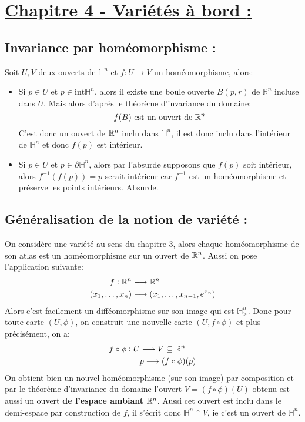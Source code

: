 \section*{\uline{Chapitre 4 - Variétés à bord {:}}}
   \subsection*{Invariance par homéomorphisme {:}}
      Soit \(U, V\) deux ouverts de \( \mathbb{H}^n \) et \(f : U \longrightarrow V\) un homéomorphisme, alors:
      \begin{itemize}
         \item Si \( p \in U \) et \( p \in \text{int}\mathbb{H}^n\), alors il existe une boule ouverte \( B(p, r) \) de \( \mathbb{R}^n \) incluse dans \( U \). Mais alors d'aprés le théorème d'invariance du domaine:
         \[ 
            f(B) \text{ est un ouvert de } \mathbb{R}^n 
         \]
         C'est donc un ouvert de \( \mathbb{R}^n \) inclu dans \( \mathbb{H}^n \), il est donc inclu dans l'intérieur de \( \mathbb{H}^n \) et donc \( f(p) \) est intérieur.
         \item Si \( p \in U \) et \( p \in \partial\mathbb{H}^n\), alors par l'absurde supposons que \( f(p) \) soit intérieur, alors \( f^{-1}(f(p)) = p\) serait intérieur car \( f^{-1} \) est un homéomorphisme et préserve les points intérieurs. Absurde. 
      \end{itemize}
   \subsection*{Généralisation de la notion de variété {:}}
      On considère une variété au sens du chapitre \( 3 \), alors chaque homéomorphisme de son atlas est un homéomorphisme sur un ouvert de \( \mathbb{R}^n \). Aussi on pose l'application suivante:
      \begin{align*}
         f: \mathbb{R}^n  &\longrightarrow \mathbb{R}^n\\
         (x_1, \ldots, x_n) &\longrightarrow (x_1, \ldots, x_{n-1}, e^{x_n})
      \end{align*}
      Alors c'est facilement un difféomorphisme sur son image qui est \( \mathbb{H}^n_> \). Donc pour toute carte \( (U, \phi) \), on construit une nouvelle carte \( (U, f \circ \phi) \) et plus précisément, on a:
      \begin{align*}
         f \circ \phi : U &\longrightarrow V \subseteq \mathbb{R}^n\\
         &p \longrightarrow (f \circ \phi)(p)
      \end{align*}
      On obtient bien un nouvel homéomorphisme (sur son image) par composition et par le théorème d'invariance du domaine l'ouvert \( V = (f \circ \phi)(U) \) obtenu est aussi un ouvert \textbf{de l'espace ambiant} \( \mathbb{R}^n \). Aussi cet ouvert est inclu dans le demi-espace par construction de \( f \), il s'écrit donc \( \mathbb{H}^n \cap V \), ie c'est un ouvert de \( \mathbb{H}^n \).\<

